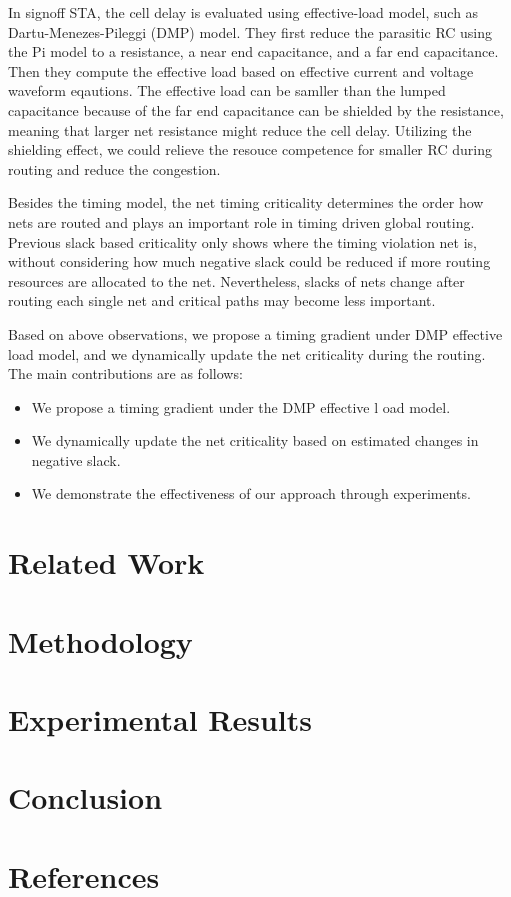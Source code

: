 \documentclass[conference]{IEEEtran}
\begin{document}
In signoff STA, the cell delay is evaluated using effective-load model, such as 
Dartu-Menezes-Pileggi (DMP) \cite{dmp} model. They first reduce the parasitic RC 
using the Pi model \cite{PImodel} to a resistance, a near end capacitance, and a 
far end capacitance. 
Then they compute the effective load based
on effective current and voltage waveform eqautions. 
The effective load can be samller than the lumped capacitance because of the 
far end capacitance
can be shielded by the resistance, 
meaning that larger net resistance might reduce the cell delay.
Utilizing the shielding effect, we could relieve the resouce competence for smaller RC during routing 
and reduce the congestion. 

Besides the timing model, the net timing criticality determines the order how nets are routed and plays an important role in
timing driven global routing.
Previous slack based
criticality only shows where the timing violation net is, without considering how much 
negative slack could be reduced if more routing resources are allocated to the net. 
Nevertheless, slacks of nets change after routing each single net and critical paths may become less important. 

Based on above observations, we propose a timing gradient under DMP effective load model,
and we dynamically update the net criticality during the routing.   
The main contributions are as follows:
\begin{itemize}
    \item We propose a timing gradient under the DMP effective l
    oad model.
    \item We dynamically update the net criticality based on estimated changes in negative slack.
    \item We demonstrate the effectiveness of our approach through experiments.
\end{itemize}


\section{Related Work}
\label{sec:related-work}

\section{Methodology}
\label{sec:methodology}

\section{Experimental Results}
\label{sec:experiments}

\section{Conclusion}
\label{sec:conclusion}


\section*{References}
\end{document}
